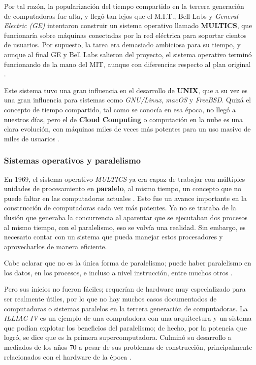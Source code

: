 \documentclass[letterpaper,12pt,oneside]{book}
\begin{document}
        Por tal razón, la popularización del tiempo compartido en la tercera generación de computadoras
	    fue alta, y llegó tan lejos que el M.I.T., Bell Labs y \textit{ General Electric (GE)} intentaron construir un sistema operativo llamado \textbf{MULTICS}, que funcionaría sobre máquinas conectadas por 
	    la red eléctrica para soportar cientos de usuarios. Por supuesto, la tarea era demasiado ambiciosa para su tiempo, y aunque al final GE y Bell Labs
	    salieron del proyecto, el sistema operativo terminó funcionando de la mano del MIT, aunque con diferencias respecto al plan original \cite{tanenbaum_modern_2002}.
     
        Este sistema tuvo una gran influencia en el desarrollo de \textbf{UNIX}, que
	    a su vez es una gran influencia para sistemas como \textit{GNU/Linux}, \textit{macOS} y \textit{FreeBSD}. Quizá el concepto de tiempo compartido, tal como se conocía en esa época, no llegó
	    a nuestros días, pero el de \textbf{Cloud Computing} o computación en la nube es una clara evolución, con máquinas miles de veces más potentes para un uso masivo de miles de
	    usuarios \cite{tanenbaum_modern_2002}.
        \subsubsection{Sistemas operativos y paralelismo}
        
		En 1969, el sistema operativo \textit{MULTICS} ya era capaz de trabajar con múltiples unidades de procesamiento en \textbf{paralelo}, al mismo tiempo, un concepto que
		no puede faltar en las computadoras actuales \cite[p. 899]{silberschatz_operating_2009}. Esto fue un avance importante
		en la construcción de computadoras cada vez más potentes. Ya no se trataba de la ilusión que generaba la concurrencia
		al aparentar que se ejecutaban dos procesos al mismo tiempo, con el paralelismo, eso se volvía una realidad. Sin embargo,   
		es necesario contar con un sistema 	
		que pueda manejar estos procesadores y aprovecharlos de manera eficiente.
        
        Cabe aclarar que no es la única forma de paralelismo; puede haber paralelismo en
		los datos, en los procesos, e incluso a nivel instrucción, entre muchos otros \cite{null_mariesim_2003}.
		
		Pero sus inicios no fueron fáciles; requerían de hardware muy especializado para ser realmente útiles, por lo que no hay muchos casos documentados
		de computadoras o sistemas paralelos en la tercera generación de computadoras. La \textit{ILLIAC IV} es un ejemplo de una computadora con
		una arquitectura y un sistema que podían explotar los beneficios del paralelismo; de hecho, por la potencia que logró, se dice que es la primera supercomputadora. 
		Culminó su desarrollo a mediados de los años 70 a pesar de sus problemas de construcción,
		principalmente relacionados con el hardware de la época \cite{hord_illiac_1982}.
		
\end{document}
